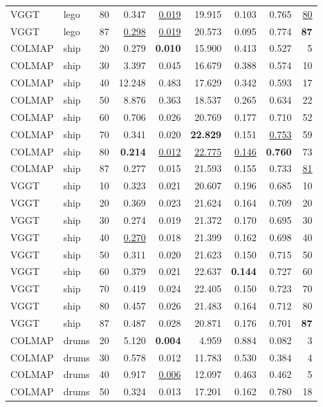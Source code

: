 \begin{table}[H]
\begin{tabular}{llrrrrrrr}
VGGT & lego & 80 & 0.347 & \underline{0.019} & 19.915 & 0.103 & 0.765 & \underline{80} \\
VGGT & lego & 87 & \underline{0.298} & \underline{0.019} & 20.573 & 0.095 & 0.774 & \textbf{87} \\
\midrule
COLMAP & ship & 20 & 0.279 & \textbf{0.010} & 15.900 & 0.413 & 0.527 & 5 \\
COLMAP & ship & 30 & 3.397 & 0.045 & 16.679 & 0.388 & 0.574 & 10 \\
COLMAP & ship & 40 & 12.248 & 0.483 & 17.629 & 0.342 & 0.593 & 17 \\
COLMAP & ship & 50 & 8.876 & 0.363 & 18.537 & 0.265 & 0.634 & 22 \\
COLMAP & ship & 60 & 0.706 & 0.026 & 20.769 & 0.177 & 0.710 & 52 \\
COLMAP & ship & 70 & 0.341 & 0.020 & \textbf{22.829} & 0.151 & \underline{0.753} & 59 \\
COLMAP & ship & 80 & \textbf{0.214} & \underline{0.012} & \underline{22.775} & \underline{0.146} & \textbf{0.760} & 73 \\
COLMAP & ship & 87 & 0.277 & 0.015 & 21.593 & 0.155 & 0.733 & \underline{81} \\
VGGT & ship & 10 & 0.323 & 0.021 & 20.607 & 0.196 & 0.685 & 10 \\
VGGT & ship & 20 & 0.369 & 0.023 & 21.624 & 0.164 & 0.709 & 20 \\
VGGT & ship & 30 & 0.274 & 0.019 & 21.372 & 0.170 & 0.695 & 30 \\
VGGT & ship & 40 & \underline{0.270} & 0.018 & 21.399 & 0.162 & 0.698 & 40 \\
VGGT & ship & 50 & 0.311 & 0.020 & 21.623 & 0.150 & 0.715 & 50 \\
VGGT & ship & 60 & 0.379 & 0.021 & 22.637 & \textbf{0.144} & 0.727 & 60 \\
VGGT & ship & 70 & 0.419 & 0.024 & 22.405 & 0.150 & 0.723 & 70 \\
VGGT & ship & 80 & 0.457 & 0.026 & 21.483 & 0.164 & 0.712 & 80 \\
VGGT & ship & 87 & 0.487 & 0.028 & 20.871 & 0.176 & 0.701 & \textbf{87} \\
\midrule
COLMAP & drums & 20 & 5.120 & \textbf{0.004} & 4.959 & 0.884 & 0.082 & 3 \\
COLMAP & drums & 30 & 0.578 & 0.012 & 11.783 & 0.530 & 0.384 & 4 \\
COLMAP & drums & 40 & 0.917 & \underline{0.006} & 12.097 & 0.463 & 0.462 & 5 \\
COLMAP & drums & 50 & 0.324 & 0.013 & 17.201 & 0.162 & 0.780 & 18 \\

\end{tabular}
\end{table}

